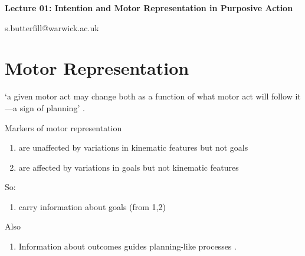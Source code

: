 \documentclass[12pt]{extarticle}
\date{}
\makeatletter
\def \ititle {Origins of Mind}
\def \iemail{s.butterfill@warwick.ac.uk}
\makeatother
\begin{document}
\begin{multicols*}{3}

\setlength\footnotesep{1em}










\def \ititle {Lecture 01: Intention and Motor Representation in Purposive Action}

\begin{center}

{\Large

\textbf{\ititle}

}



\iemail %

\end{center}




\section{Motor Representation}

‘a given motor act may change both as a function of what motor act will follow it—a sign of
planning’ \citep[p.~294]{cohen:2004_wherea}.


Markers of motor representation
\begin{enumerate}
\item are unaffected by variations in kinematic features but not goals
  \citep[e.g.][]{cattaneo:2010_state-dependent,umilta:2008pliers,rochat:2010_responses}
\item are affected by variations in goals but not kinematic features
  \citep[e.g.][]{Fogassi:2005nf,bonini:2010_ventral,Umilta:2001zr,villiger:2010_activity,koch:2010_resonance}
\end{enumerate}
So:
\begin{enumerate}[resume]
\item carry information about goals (from 1,2)
\end{enumerate}
Also
\begin{enumerate}[resume]
\item Information about outcomes guides planning-like processes
  \citep[consider][]{grafton:2007_evidence,jeannerod:1988_neural,wolpert:1995internal, miall:1996_forward,mason:2001_hand,santello:2002_patterns}.
\end{enumerate}







\end{multicols*}
\end{document}
